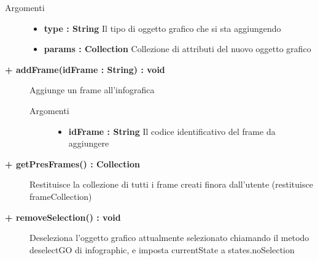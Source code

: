 \begin{description}
\begin{description}
		\begin{description}
			\item[Argomenti] \hfill
				\begin{itemize}
				
					\item \textbf{type : String	} \hfill
					Il tipo di oggetto grafico che si sta aggiungendo
					\item \textbf{params : Collection	} \hfill
					Collezione di attributi del nuovo oggetto grafico
				\end{itemize}
		\end{description}
	\end{description}
	
	\begin{description}
		\item[\textbf{\color{blue}+ addFrame(idFrame : String) : void 	}] \hfill
			Aggiunge un frame all'infografica
			
		\begin{description}
			\item[Argomenti] \hfill
				\begin{itemize}
				
					\item \textbf{idFrame : String	} \hfill
					Il codice identificativo del frame da aggiungere
				\end{itemize}
		\end{description}
	\end{description}
	
	\begin{description}
		\item[\textbf{\color{blue}+ getPresFrames() : Collection 	}] \hfill
			Restituisce la collezione di tutti i frame creati finora dall'utente (restituisce frameCollection)
	
	\end{description}
	
	\begin{description}
		\item[\textbf{\color{blue}+ removeSelection() : void 	}] \hfill
			Deseleziona l'oggetto grafico attualmente selezionato chiamando il metodo deselectGO di infographic, e imposta currentState a states.noSelection
	
	\end{description}
	

\end{description}
